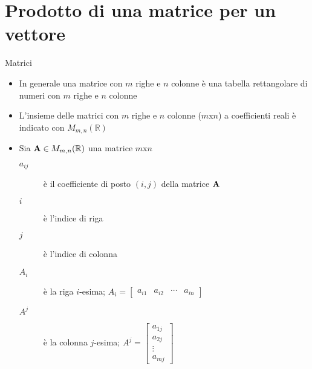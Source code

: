 \documentclass{beamer}
\begin{document}
\section{Prodotto di una matrice per un vettore}

\begin{frame}{Matrici}
\footnotesize{
  \begin{itemize}
  \item In generale una matrice con $m$ righe e $n$ colonne \`e
  una tabella rettangolare di numeri con $m$ righe e $n$
  colonne
  
  \item L'insieme delle matrici con $m$ righe e $n$ colonne ($m$x$n$) a coefficienti
  reali \`e indicato con $M_{m,n}(\mathbb{R})$

  \item Sia $\mathbf{A} \in M_{m,n}(\mathbb{R})$ una matrice $m$x$n$
  \begin{description}
   \item[$a_{ij}$] \`e il coefficiente di posto $(i, j)$ della matrice $\mathbf{A}$
   \item[$i$]  \`e l'indice di riga
   \item[$j$] \`e l'indice di colonna
   \item[$A_i$] \`e la riga $i$-esima; $A_i=\left[\begin{array}{cccc}a_{i1}&a_{i2}&\cdots&a_{in}\end{array}\right]$
   \item[$A^j$] \`e la colonna $j$-esima; $A^j=\left[\begin{array}{c}a_{1j}\\a_{2j}\\\vdots\\a_{mj}\end{array}\right]$
  \end{description}
  \end{itemize}
}
\end{frame}
\end{document}
